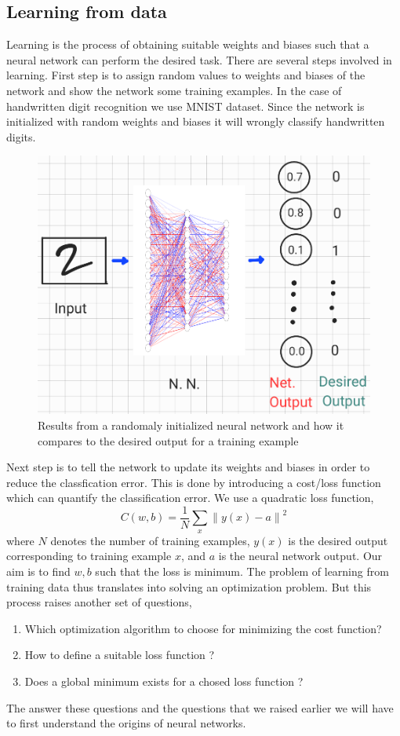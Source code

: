 \subsection{Learning from data}
Learning is the process of obtaining suitable weights and biases such that a neural network can perform
the desired task. There are several steps involved in learning. First step is to assign random values to 
weights and biases of the network and show the network some training examples. In the case of handwritten digit recognition
we use MNIST dataset. Since the network is initialized with random weights and biases it will wrongly classify handwritten digits. 
\begin{figure}[htbp]
    \centering
    \includegraphics[width=.4\textwidth]{Figures/rand_inp.png}
    \caption{Results from a randomaly initialized neural network and how it compares to the desired output for a training example}
    \label{fig:randinp}
\end{figure} 
Next step is to tell the network to update its weights and biases in order to reduce the classfication error. This is done by introducing a 
cost/loss function which can quantify the classification error. We use a quadratic loss function, 
$$C(w,b) = \frac{1}{N} \sum_x {\|y(x) - a\|}^2$$
where $N$ denotes the number of training examples, $y(x)$ is the desired output corresponding to training example $x$, and 
$a$ is the neural network output. Our aim is to find $w,b$ such that the loss is minimum. The problem of learning from training data thus translates into
solving an optimization problem. But this process raises another set of questions,
\begin{enumerate}
    \item Which optimization algorithm to choose for minimizing the cost function?
    \item How to define a suitable loss function ?
    \item Does a global minimum exists for a chosed loss function ?
\end{enumerate}
The answer these questions and the questions that we raised earlier we will have to first understand the origins of neural networks.
